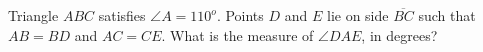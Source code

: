Triangle $ABC$ satisfies $\angle A = 110^o$. Points $D$ and $E$ lie on side $\overline{BC}$ such that $AB = BD$ and $AC = CE$. What is the measure of $\angle DAE$, in degrees?
